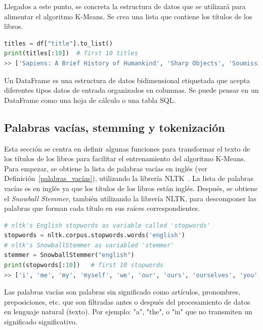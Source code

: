 \documentclass{uimppracticas}
\begin{document}
Llegados a este punto, se concreta la estructura de datos que se utilizará para alimentar el algoritmo K-Means. Se crea una lista que contiene los títulos de los libros.

\begin{lstlisting}[language=python]
titles = df["title"].to_list()
print(titles[:10])  # first 10 titles
>> ['Sapiens: A Brief History of Humankind', 'Sharp Objects', 'Soumission', 'Tipping the Velvet', 'A Light in the Attic', "It's Only the Himalayas", 'Libertarianism for Beginners', 'Mesaerion: The Best Science Fiction Stories 1800-1849', 'Olio', 'Our Band Could Be Your Life: Scenes from the American Indie Underground, 1981-1991']
\end{lstlisting}

\begin{definition}\label{dataframe}
Un DataFrame es una estructura de datos bidimensional etiquetada que acepta diferentes tipos datos de entrada organizados en columnas. Se puede pensar en un DataFrame como una hoja de cálculo o una tabla SQL.
\end{definition}

\subsection{Palabras vacías, stemming y tokenización}

Esta sección se centra en definir algunas funciones para transformar el texto de los títulos de los libros para facilitar el entrenamiento del algoritmo K-Means. Para empezar, se obtiene la lista de palabras vacías en inglés (ver Definición~\ref{palabras_vacías}), utilizando la librería NLTK~\cite{bird2009natural}. La lista de palabras vacías es en inglés ya que los títulos de los libros están inglés. Después, se obtiene el \textit{Snowball Stemmer}, también utilizando la librería NLTK, para descomponer las palabras que forman cada título en sus raíces correspondientes.

\begin{lstlisting}[language=python]
# nltk's English stopwords as variable called 'stopwords'	
stopwords = nltk.corpus.stopwords.words('english')  
# nltk's SnowballStemmer as variabled 'stemmer'
stemmer = SnowballStemmer("english")
print(stopwords[:10])   # first 10 stopwords
>> ['i', 'me', 'my', 'myself', 'we', 'our', 'ours', 'ourselves', 'you', "you're"]    
\end{lstlisting}

\begin{definition}\label{palabras_vacías}
Las palabras vacías son palabras sin significado como artículos, pronombres, preposiciones, etc. que son filtradas antes o después del procesamiento de datos en lenguaje natural (texto). Por ejemplo: "a", "the", o "in" que no transmiten un significado significativo.
\end{definition}
\end{document}
